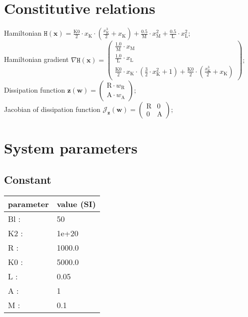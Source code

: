 \documentclass[11pt, oneside]{article}      %
\begin{document}
\section{Constitutive relations}
%
Hamiltonian $ \mathtt{H}(\mathbf{x}) = \frac{\mathrm{K0}}{2} \cdot x_{\mathrm{K}} \cdot \left(\frac{x_{\mathrm{K}}^{3}}{2} + x_{\mathrm{K}}\right) + \frac{0.5}{\mathrm{M}} \cdot x_{\mathrm{M}}^{2} + \frac{0.5}{\mathrm{L}} \cdot x_{\mathrm{L}}^{2} ; $ 
%
\\
%
Hamiltonian gradient $ \nabla \mathtt{H}(\mathbf{x}) = \left(\begin{array}{c}\frac{1.0}{\mathrm{M}} \cdot x_{\mathrm{M}}\\\frac{1.0}{\mathrm{L}} \cdot x_{\mathrm{L}}\\\frac{\mathrm{K0}}{2} \cdot x_{\mathrm{K}} \cdot \left(\frac{3}{2} \cdot x_{\mathrm{K}}^{2} + 1\right) + \frac{\mathrm{K0}}{2} \cdot \left(\frac{x_{\mathrm{K}}^{3}}{2} + x_{\mathrm{K}}\right)\end{array}\right) ; $ 
%
\\
%
Dissipation function $ \mathbf{z}(\mathbf{w}) = \left(\begin{array}{c}\mathrm{R} \cdot w_{\mathrm{R}}\\\mathrm{A} \cdot w_{\mathrm{A}}\end{array}\right) ; $ 
%
\\
%
Jacobian of dissipation function $ \mathcal{J}_{\mathbf{z}}(\mathbf{w}) = \left(\begin{array}{cc}\mathrm{R} & 0\\0 & \mathrm{A}\end{array}\right) ; $ 
%
\\
%
%
\section{System parameters}
%
%
\subsection{Constant}
%
\begin{center}
%
\begin{tabular}{ll}
%
\hline
parameter & value (SI)
\\ \hline
Bl :& 50
\\
K2 :& 1e+20
\\
R :& 1000.0
\\
K0 :& 5000.0
\\
L :& 0.05
\\
A :& 1
\\
M :& 0.1
\\
\hline
\end{tabular}
%
\end{center}
%
\end{document}
